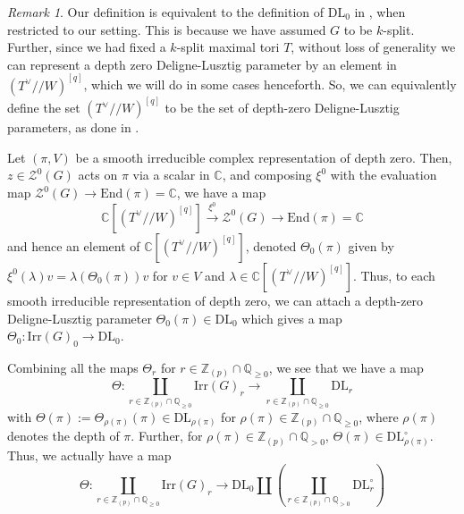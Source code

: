 \documentclass[11 pt]{article}
\numberwithin{equation}{subsection}
\theoremstyle{definition}
\theoremstyle{remark}
\newtheorem{remark}[theorem]{Remark}
\theoremstyle{conjecture}
\newcommand{\Irr}{\mathrm{Irr}}
\newcommand{\DL}{\mathrm{DL}}
\newcommand{\Z}{\mathbb Z}
\newcommand{\Q}{\mathbb Q}
\newcommand{\C}{\mathbb C}
\newcommand{\ZZ}{\mathcal{Z}}
\begin{document}
\begin{remark}
    Our definition is equivalent to the definition of $\mathrm{DL}_0$ in \cite[Section 7.1]{chendebackertsai}, when restricted to our setting. This is because we have assumed $G$ to be $k$-split. Further, since we had fixed a $k$-split maximal tori $T$, without loss of generality we can represent a depth zero Deligne-Lusztig parameter by an element in $(T^\vee//W)^{[q]}$, which we will do in some cases henceforth. So, we can equivalently define the set $(T^\vee//W)^{[q]}$ to be the set of depth-zero Deligne-Lusztig parameters, as done in \cite{cb24}.
\end{remark}
Let $(\pi, V)$ be a smooth irreducible complex representation of depth zero. Then, $z \in \ZZ^0(G)$ acts on $\pi$ via a scalar in $\C$, and composing $\xi^0$ with the evaluation map $\ZZ^0(G)\rightarrow \mathrm{End}(\pi)=\C$, we have a map 
\begin{equation*}
    \C[(T^\vee//W)^{[q]}] \xrightarrow{\xi^0}\ZZ^0(G)\rightarrow \mathrm{End}(\pi)=\C
\end{equation*}
and hence an element of $\C[(T^\vee//W)^{[q]}]$, denoted $\Theta_0(\pi)$ given by $\xi^0(\lambda)v=\lambda(\Theta_0(\pi))v$ for $v \in V$ and $\lambda \in \C[(T^\vee//W)^{[q]}]$. Thus, to each smooth irreducible representation of depth zero, we can attach a depth-zero Deligne-Lusztig parameter $\Theta_0(\pi)\in \mathrm{DL}_0$ which gives a map $\Theta_0:\Irr(G)_0\rightarrow \DL_0$. \par
Combining all the maps $\Theta_r$ for $r \in \Z_{(p)}\cap \Q_{\geq 0}$, we see that we have a map 
\begin{equation*}
    \Theta:\coprod_{r \in \Z_{(p)}\cap \Q_{\geq 0}} \Irr(G)_r \longrightarrow \coprod_{r \in \Z_{(p)}\cap \Q_{\geq 0}}\mathrm{DL}_r
\end{equation*}
with $\Theta(\pi) := \Theta_{\rho(\pi)}(\pi)\in \mathrm{DL}_{\rho(\pi)}$ for $\rho(\pi) \in \Z_{(p)}\cap \Q_{\geq 0}$, where $\rho(\pi)$ denotes the depth of $\pi$. Further, for $\rho(\pi) \in \Z_{(p)}\cap \Q_{> 0}$, $\Theta(\pi)\in \DL_{\rho(\pi)}^\circ$. Thus, we actually have a map 
\begin{equation}\label{DLparametersalltame}
     \Theta:\coprod_{r \in \Z_{(p)}\cap \Q_{\geq 0}} \Irr(G)_r \longrightarrow \DL_0\coprod \left(\coprod_{r \in \Z_{(p)}\cap \Q_{> 0}}\mathrm{DL}_r^\circ\right)
\end{equation}
\end{document}
